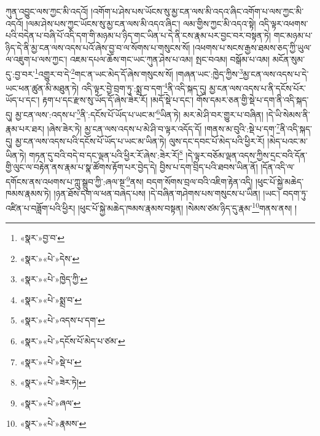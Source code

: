 ཀུན་འབྱུང་ལས་ཀྱང་མི་འདའོ། །འགོག་པ་ཤེས་པས་ཡོངས་སུ་མྱ་ངན་ལས་མི་འདའ་ཞིང་འགོག་པ་ལས་ཀྱང་མི་འདའོ། །ལམ་ཤེས་པས་ཀྱང་ཡོངས་སུ་མྱ་ངན་ལས་མི་འདའ་ཞིང་། ལམ་གྱིས་ཀྱང་མི་འདའ་སྟེ། འདི་ལྟར་འཕགས་པའི་བདེན་པ་བཞི་པོ་འདི་དག་གི་མཉམ་པ་ཉིད་གང་ཡིན་པ་དེ་ནི་ངས་རྣམ་པར་བྱང་བར་བསྟན་ཏེ། གང་མཉམ་པ་ཉིད་དེ་ནི་མྱ་ངན་ལས་འདས་པའོ་ཞེས་བྱ་བ་ལ་སོགས་པ་གསུངས་སོ། །འཕགས་པ་སངས་རྒྱས་ཐམས་ཅད་ཀྱི་ཡུལ་ལ་འཇུག་པ་ལས་ཀྱང་། འཇམ་དཔལ་ཆོས་གང་ཡང་ཀུན་ཤེས་པ་འམ། སྤང་བའམ། བསྒོམ་པ་འམ། མངོན་སུམ་དུ་:བྱ་བར་\footnote{«སྣར་»བྱ་བ་}འགྱུར་བ་དེ་\footnote{«སྣར་»«པེ་»དེས་}གང་ན་ཡང་མེད་དོ་ཞེས་གསུངས་སོ། །གཞན་ཡང་:ཁྱེད་ཀྱིས་\footnote{«སྣར་»«པེ་»ཁྱེད་ཀྱི་}མྱ་ངན་ལས་འདས་པ་དེ་ཡང་ཕན་ཚུན་མི་མཐུན་ཏེ། འདི་ལྟར་བྱེ་བྲག་ཏུ་:སྨྲ་བ་དག་\footnote{«སྣར་»«པེ་»སྨྲ་བ་}ནི་འདི་སྐད་དུ། མྱ་ངན་ལས་འདས་པ་ནི་དངོས་པོར་ཡོད་པ་དང་། རྟག་པ་དང་རྫས་སུ་ཡོད་དོ་ཞེས་ཟེར་རོ། །མདོ་སྡེ་པ་དང་། གོས་དམར་ཅན་གྱི་སྡེ་པ་དག་ནི་འདི་སྐད་དུ། མྱ་ངན་ལས་:འདས་པ་\footnote{«སྣར་»«པེ་»འདས་པ་དག་}ནི་:དངོས་པོ་ཡོད་པ་ཡང་མ་\footnote{«སྣར་»«པེ་»དངོས་པོ་མེད་པ་ཙམ་}ཡིན་ཏེ། མར་མེ་ཤི་བར་གྱུར་པ་བཞིན། །དེ་ཡི་སེམས་ནི་རྣམ་པར་ཐར། །ཞེས་ཟེར་ཏེ། མྱ་ངན་ལས་འདས་པ་མེ་ཤི་བ་ལྟར་འདོད་དོ། །གནས་མ་བུའི་:སྡེ་པ་དག་\footnote{«སྣར་»«པེ་»སྡེ་པ་}ནི་འདི་སྐད་དུ། མྱ་ངན་ལས་འདས་པའི་དངོས་པོ་ཡོད་པ་ཡང་མ་ཡིན་ཏེ། ལུས་དང་དབང་པོ་མེད་པའི་ཕྱིར་རོ། །མེད་པའང་མ་ཡིན་ཏེ། གཏན་དུ་བའི་བདེ་བ་དང་ལྡན་པའི་ཕྱིར་རོ་ཞེས་:ཟེར་རོ།\footnote{«སྣར་»«པེ་»ཟེར་ཏེ།} །དེ་ལྟར་བཅོམ་ལྡན་འདས་ཀྱིས་དྲང་བའི་དོན་གྱི་ལུང་ལ་བརྟེན་ནས་རྣམ་པ་སྣ་ཚོགས་རྟོག་པར་བྱེད་དེ། བྱིས་པ་དག་བྲིད་པའི་ཐབས་ཡིན་ནོ། །དོན་འདི་ལ་དགོངས་ནས་འཕགས་པ་ཀླུ་སྒྲུབ་ཀྱི་:ཞལ་སྔ་\footnote{«སྣར་»«པེ་»ཞལ་}ནས། བདག་སོགས་བྲལ་བའི་འཇིག་རྟེན་འདི། །ཕུང་པོ་སྐྱེ་མཆེད་ཁམས་རྣམས་ཏེ། །ཉན་ཐོས་དག་ལ་ཕན་བཞེད་པས། །དེ་བཞིན་གཤེགས་པས་གསུངས་པ་ཡིན། །ཡང་། བདག་ཏུ་འཛིན་པ་བཟློག་པའི་ཕྱིར། །ཕུང་པོ་སྐྱེ་མཆེད་ཁམས་རྣམས་བསྟན། །སེམས་ཙམ་ཉིད་དུ་རྣམ་\footnote{«སྣར་»«པེ་»རྣམས་}གནས་ནས། །
